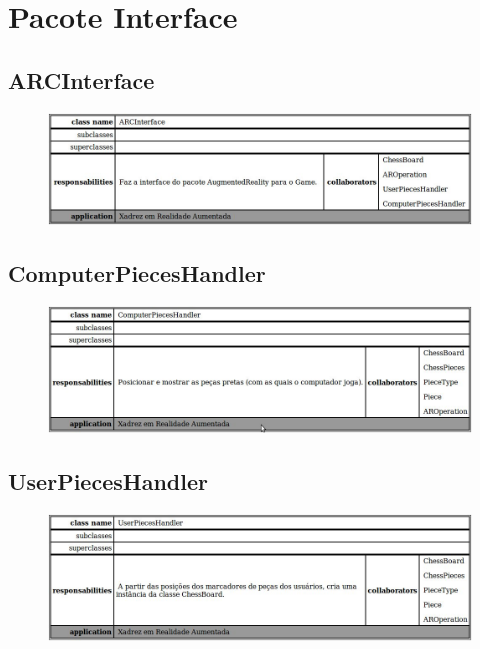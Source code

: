 \documentclass[a4paper,12pt]{book}
\begin{document}
  \section{Pacote Interface}
  \label{sec:pacoteinterface}
    \subsection{ARCInterface}
    \label{subsec:crcarcinterface}
    \begin{figure}[H]
	  \centering
	  \includegraphics[width=1.0\textwidth]{crc/ARCInterface}
	  \end{figure}
    \subsection{ComputerPiecesHandler}
    \label{subsec:crccomputerpieceshandler}
    \begin{figure}[H]
	  \centering
	  \includegraphics[width=1.0\textwidth]{crc/ComputerPiecesHandler}
	  \end{figure}
    \subsection{UserPiecesHandler}
    \label{subsec:crcuserpieceshandler}
    \begin{figure}[H]
	  \centering
	  \includegraphics[width=1.0\textwidth]{crc/UserPiecesHandler}
	  \end{figure}
\end{document}
